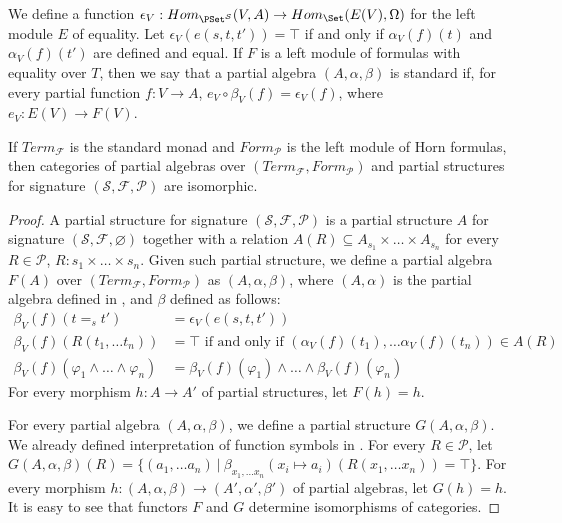 We define a function $\epsilon_V : Hom_{\PSet^\mathcal{S}}(V,A) \to Hom_\Set(E(V),\Omega)$ for the left module $E$ of equality.
Let $\epsilon_V(e(s,t,t')) = \top$ if and only if $\alpha_V(f)(t)$ and $\alpha_V(f)(t')$ are defined and equal.
If $F$ is a left module of formulas with equality over $T$, then we say that a partial algebra $(A,\alpha,\beta)$ is standard
    if, for every partial function $f : V \to A$, $e_V \circ \beta_V(f) = \epsilon_V(f)$, where $e_V : E(V) \to F(V)$.

\begin{lem}
If $Term_\mathcal{F}$ is the standard monad and $Form_\mathcal{P}$ is the left module of Horn formulas,
    then categories of partial algebras over $(Term_\mathcal{F},Form_\mathcal{P})$ and partial structures for signature $(\mathcal{S},\mathcal{F},\mathcal{P})$ are isomorphic.
\end{lem}
\begin{proof}
A partial structure for signature $(\mathcal{S},\mathcal{F},\mathcal{P})$ is a partial structure $A$ for signature $(\mathcal{S},\mathcal{F},\varnothing)$
    together with a relation $A(R) \subseteq A_{s_1} \times \ldots \times A_{s_n}$ for every $R \in \mathcal{P}$, $R : s_1 \times \ldots \times s_n$.
Given such partial structure, we define a partial algebra $F(A)$ over $(Term_\mathcal{F},Form_\mathcal{P})$ as $(A,\alpha,\beta)$,
    where $(A,\alpha)$ is the partial algebra defined in , and $\beta$ defined as follows:
\begin{align*}
\beta_V(f)(t =_s t') & = \epsilon_V(e(s,t,t')) \\
\beta_V(f)(R(t_1, \ldots t_n)) & = \top \text{ if and only if } (\alpha_V(f)(t_1), \ldots \alpha_V(f)(t_n)) \in A(R) \\
\beta_V(f)(\varphi_1 \land \ldots \land \varphi_n) & = \beta_V(f)(\varphi_1) \land \ldots \land \beta_V(f)(\varphi_n)
\end{align*}
For every morphism $h : A \to A'$ of partial structures, let $F(h) = h$.

For every partial algebra $(A,\alpha,\beta)$, we define a partial structure $G(A,\alpha,\beta)$.
We already defined interpretation of function symbols in .
For every $R \in \mathcal{P}$, let $G(A,\alpha,\beta)(R) = \{ (a_1, \ldots a_n)\ |\ \beta_{x_1, \ldots x_n}(x_i \mapsto a_i)(R(x_1, \ldots x_n)) = \top \}$.
For every morphism $h : (A,\alpha,\beta) \to (A',\alpha',\beta')$ of partial algebras, let $G(h) = h$.
It is easy to see that functors $F$ and $G$ determine isomorphisms of categories.
\end{proof}

